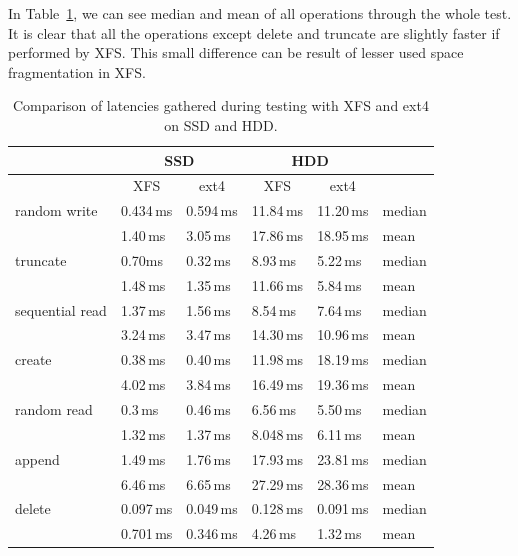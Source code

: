 \documentclass[
  color, %
  table, %
  lof,   %
  lot,   %
]{fithesis3}
\begin{document}
In Table~\ref{tab:hdd_ssd_xfs_ext4}, we can see median and mean of all operations through the whole test. It is clear that all the operations except delete and truncate are slightly faster if performed by XFS. This small difference can be result of lesser used space fragmentation in XFS.

\begin{table}
\centering

\begin{tabular}{|l|l|l|l|l|l|}
\hline
   & \multicolumn{2}{|c|}{SSD} & \multicolumn{2}{|c|}{HDD} & \\ \hline

 & \multicolumn{1}{|c|}{XFS} & \multicolumn{1}{|c|}{ext4} & \multicolumn{1}{|c|}{XFS} & \multicolumn{1}{|c|}{ext4} &  \\
\hline
    random write & 0.434\,ms & 0.594\,ms & 11.84\,ms & 11.20\,ms & median\\
 \hline
                 & 1.40\,ms & 3.05\,ms & 17.86\,ms & 18.95\,ms & mean\\
    \hline
        truncate & 0.70ms & 0.32\,ms & 8.93\,ms & 5.22\,ms & median\\
    \hline
                 & 1.48\,ms & 1.35\,ms& 11.66\,ms & 5.84\,ms & mean\\
    \hline
           sequential read & 1.37\,ms & 1.56\,ms & 8.54\,ms & 7.64\,ms & median\\
    \hline
                 & 3.24\,ms & 3.47\,ms & 14.30\,ms & 10.96\,ms & mean\\
    \hline
          create & 0.38\,ms & 0.40\,ms & 11.98\,ms & 18.19\,ms & median\\
    \hline
                 & 4.02\,ms & 3.84\,ms & 16.49\,ms & 19.36\,ms & mean\\
    \hline
     random read & 0.3\,ms & 0.46\,ms & 6.56\,ms & 5.50\,ms & median\\
    \hline
                 & 1.32\,ms & 1.37\,ms & 8.048\,ms  & 6.11\,ms &mean\\
    \hline
          append & 1.49\,ms & 1.76\,ms & 17.93\,ms & 23.81\,ms & median \\
    \hline
                 & 6.46\,ms & 6.65\,ms & 27.29\,ms & 28.36\,ms &mean\\
    \hline
          delete & 0.097\,ms & 0.049\,ms & 0.128\,ms & 0.091\,ms & median\\
    \hline
                & 0.701\,ms & 0.346\,ms & 4.26\,ms & 1.32\,ms & mean\\
    \hline
\end{tabular}
\caption{Comparison of latencies gathered during testing with XFS and ext4 on SSD and HDD.}
\label{tab:hdd_ssd_xfs_ext4}
\end{table}
\end{document}

